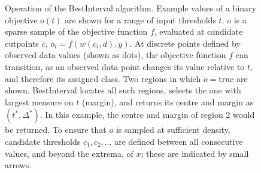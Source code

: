 \documentclass[dissertation.tex]{subfiles}
\begin{document}
\begin{figure}[!htbp]
\caption[Operation of the BestInterval algorithm]{Operation of the BestInterval algorithm.  Example values of a binary objective $o(t)$ are shown for a range of input thresholds $t$.  $o$ is a sparse sample of the objective function $f$, evaluated at candidate cutpoints $c$, $o_i = f(w(c_i,d),y)$.  At discrete points defined by observed data values (shown as dots), the objective function $f$ can transition, as an observed data point changes its value relative to $t$, and therefore its assigned class.  Two regions in which $o = \mathrm{true}$ are shown.  BestInterval locates all such regions, selects the one with largest measure on $t$ (margin), and returns its centre and margin as $(t^*, \Delta^*)$.  In this example, the centre and margin of region 2 would be returned.  To ensure that $o$ is sampled at sufficient density, candidate thresholds $c_1, c_2, \dots$ are defined between all consecutive values, and beyond the extrema, of $x$; these are indicated by small arrows.}
\label{fig:mess-bestinterval}
\end{figure}
\end{document}
